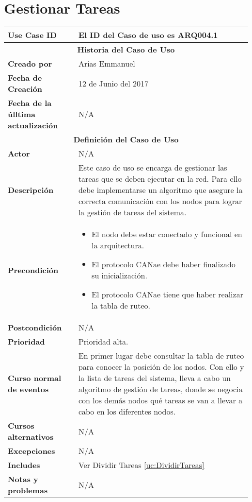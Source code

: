
\section{Gestionar Tareas}\label{uc:GestionarTareas}

\begin{longtable}{|p{5cm}|p{8cm}|}
  \hline
  \textbf{Use Case ID} & El ID del Caso de uso es ARQ004.1 \\ \hline
  \multicolumn{2}{|c|}{\Large\textbf{Historia del Caso de Uso}} \\ \hline
  \textbf{Creado por} & Arias Emmanuel \\ \hline
  \textbf{Fecha de Creación} & 12 de Junio del 2017 \\ \hline
  \textbf{Fecha de la úlltima actualización} & N/A \\ \hline
  \multicolumn{2}{|c|}{\Large\textbf{Definición del Caso de Uso}} \\ \hline
  \textbf{Actor} & N/A \\ \hline
  \textbf{Descripción} & Este caso de uso se encarga de gestionar las tareas que se deben
ejecutar en la red. Para ello debe implementarse un algoritmo que
asegure la correcta comunicación con los nodos para lograr
la gestión de tareas del sistema. \\ \hline
  \textbf{Precondición} & \begin{itemize}
\item El nodo debe estar conectado y funcional en la arquitectura.
\item El protocolo CANae debe haber finalizado su inicialización.
\item El protocolo CANae tiene que haber realizar la tabla de ruteo.
\end{itemize} \\ \hline
  \textbf{Postcondición}  & N/A \\ \hline
  \textbf{Prioridad} & Prioridad alta. \\ \hline
  \textbf{Curso normal de eventos} & En primer lugar debe consultar la tabla de ruteo para conocer la posición de los nodos.
Con ello y la lista de tareas del sistema, lleva a cabo un algoritmo de
gestión de tareas, donde se negocia con los demás nodos qué tareas se
van a llevar a cabo en los diferentes nodos. \\ \hline
\textbf{Cursos alternativos} & N/A \\ \hline
\textbf{Excepciones} & N/A \\ \hline
\textbf{Includes} & Ver Dividir Tareas \ref{uc:DividirTareas} \\ \hline
\textbf{Notas y problemas} & N/A \\ \hline
\end{longtable}


